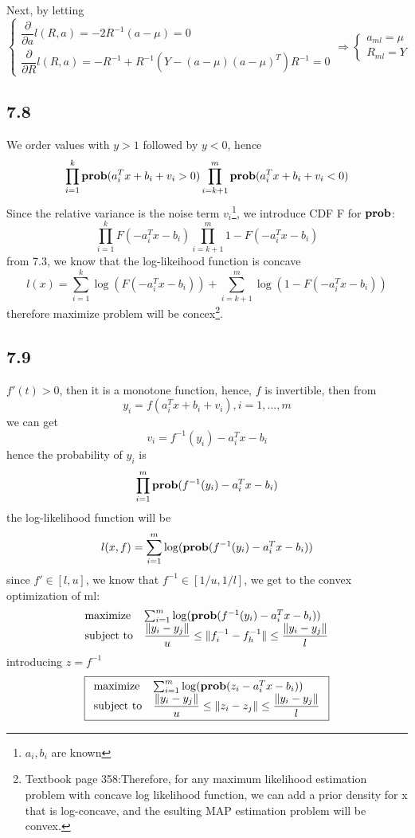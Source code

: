 \documentclass{article}
\newcommand{\prob}{{\mbox{\bf prob}}}
\begin{document}
Next, by letting
\[\begin{cases}
 \dfrac{\partial}{\partial a } l(R,a) = -2R^{-1}(a-\mu)= 0 \\
  \dfrac{\partial}{\partial R } l(R,a) = -R^{-1} + R^{-1}(Y - (a-\mu)(a-\mu)^T)R^{-1}= 0
  \end{cases} \Rightarrow \begin{cases}
a_{ml} = \mu\\
R_{ml}  = Y  \end{cases}
\]
\subsection*{7.8}
We order values with $y>1$ followed by $y<0$, hence 
\[\prod_{i=1}^{k}\prob(a_i^Tx + b_i + v_i > 0)\prod_{i=k+1}^{m}\prob(a_i^Tx + b_i + v_i < 0)\]
Since the  relative variance is the noise term $v_i$\footnote{$a_i, b_i$ are known}, we introduce CDF F for $\prob$:
\[\prod_{i=1}^{k}F(-a_i^Tx-b_i)\prod_{i=k+1}^{m}1-F(-a_i^Tx-b_i) 
\]
from 7.3, we know that the log-likeihood function is concave
\[l(x) = \sum_{i=1}^{k}\log (F(-a_i^Tx-b_i))+\sum_{i=k+1}^{m}\log (1-F(-a_i^Tx-b_i))\]
therefore maximize problem will be concex\footnote{Textbook page 358:Therefore, for any maximum likelihood estimation problem with concave log likelihood function, we can add a prior density for x that is log-concave, and the esulting MAP estimation problem will be convex.}.
\subsection*{7.9}
$f'(t) > 0$, then it is a monotone function, hence, $f$ is invertible, then from
\[ y_i = f(a_i^Tx +b_i +v_i), i=1,\dots,m\]
 we can get 
 \[v_i = f^{-1}(y_i)-a_i^Tx-b_i\]
 hence the probability of $y_i$ is 
 \[\prod_{i=1}^{m}\prob(f^{-1}(y_i)-a_i^Tx-b_i)\]
 the log-likelihood function will be
 \[l(x, f) = \sum_{i=1}^{m}\log(\prob(f^{-1}(y_i)-a_i^Tx-b_i))\]
 since $f' \in [l, u]$, we know that $f^{-1} \in [1/u, 1/l]$, we get to the convex optimization of ml:
     \[   \begin{array}{ll}
    \mbox{maximize}   &\sum_{i=1}^{m}\log(\prob(f^{-1}(y_i)-a_i^Tx-b_i))\\
    \mbox{subject to} & \dfrac{\|y_i -y_j\|}{u} \le \|f^{-1}_i - f^{-1}_h \| \le  \dfrac{\|y_i -y_j\|}{l}
        \end{array} 
  \]   
introducing $z = f^{-1}$
     \[  \boxed{  \begin{array}{ll}
    \mbox{maximize}   &\sum_{i=1}^{m}\log(\prob(z_i-a_i^Tx-b_i))\\
    \mbox{subject to} & \dfrac{\|y_i -y_j\|}{u} \le \|z_i - z_j \| \le  \dfrac{\|y_i -y_j\|}{l}
        \end{array} 
   }
  \]   
\end{document}
